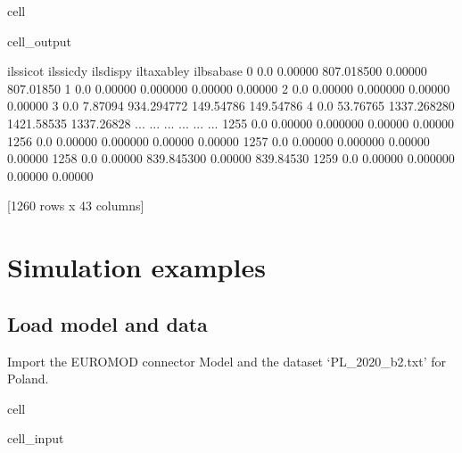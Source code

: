 \documentclass[letterpaper,10pt,english]{sphinxmanual}
\begin{document}
\begin{sphinxuseclass}{cell}
\begin{sphinxuseclass}{cell_output}
\begin{sphinxVerbatim}[commandchars=\\\{\}]
      ils\PYGZus{}sicot  ils\PYGZus{}sicdy    ils\PYGZus{}dispy  il\PYGZus{}taxabley  il\PYGZus{}bsa\PYGZus{}base  
0           0.0    0.00000   807.018500      0.00000    807.01850  
1           0.0    0.00000     0.000000      0.00000      0.00000  
2           0.0    0.00000     0.000000      0.00000      0.00000  
3           0.0    7.87094   934.294772    149.54786    149.54786  
4           0.0   53.76765  1337.268280   1421.58535   1337.26828  
...         ...        ...          ...          ...          ...  
1255        0.0    0.00000     0.000000      0.00000      0.00000  
1256        0.0    0.00000     0.000000      0.00000      0.00000  
1257        0.0    0.00000     0.000000      0.00000      0.00000  
1258        0.0    0.00000   839.845300      0.00000    839.84530  
1259        0.0    0.00000     0.000000      0.00000      0.00000  

[1260 rows x 43 columns]
\end{sphinxVerbatim}

\end{sphinxuseclass}
\end{sphinxuseclass}
\sphinxstepscope


\section{Simulation examples}
\label{\detokenize{example:simulation-examples}}\label{\detokenize{example::doc}}

\subsection{Load model and data}
\label{\detokenize{example:load-model-and-data}}
\sphinxAtStartPar
Import the EUROMOD connector Model and the dataset ‘PL\_2020\_b2.txt’ for Poland.

\begin{sphinxuseclass}{cell}
\begin{sphinxuseclass}{cell_input}
\begin{sphinxVerbatim}[commandchars=\\\{\}]
   
   
\end{sphinxVerbatim}

\end{sphinxuseclass}
\end{sphinxuseclass}
\end{document}

